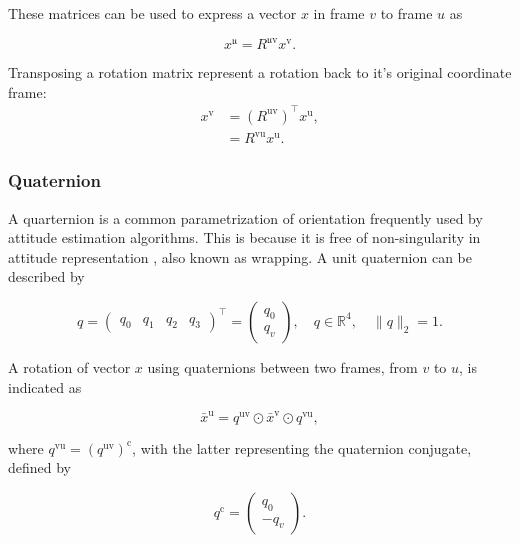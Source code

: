 These matrices can be used to express a vector $x$ in frame $v$ to frame $u$ as 

\begin{equation}
	\label{eq:rot_mat_rot_x}
	x^{\mathfrak{u}}=R^{\mathfrak{u} \mathrm{v}} x^{\mathrm{v}}.
\end{equation}

Transposing a rotation matrix represent a rotation back to it's original coordinate frame:
\begin{subequations}
	\begin{align}
		\label{eq:rot_mat_trans}
		x^{\mathrm{v}}&=\left(R^{\mathrm{uv}}\right)^{\top} x^{\mathrm{u}},\\
		&=R^{\mathrm{vu}} x^{\mathrm{u}}.
	\end{align}
\end{subequations}

\subsubsection{Quaternion}
A quarternion is a common parametrization of orientation frequently used by attitude estimation algorithms. This is because it is free of non-singularity in attitude representation \cite{Hashim2019}, also known as wrapping. A unit quaternion can be described by

\begin{equation}
	\label{eq:unit_quarternion}
	q=\left(\begin{array}{llll}{q_{0}} & {q_{1}} & {q_{2}} & {q_{3}}\end{array}\right)^{\top}
	=\left(\begin{array}{l}{q_{0}} \\ {q_{v}}\end{array}\right), 
	\quad q \in \mathbb{R}^{4}, 
	\quad\|q\|_{2}=1.
\end{equation}

A rotation of vector $x$ using quaternions between two frames, from $v$ to $u$, is indicated as

\begin{equation}
	\label{eq:quat_rot}
	\bar{x}^{\mathrm{u}}=q^{\mathrm{uv}} \odot \bar{x}^{\mathrm{v}} \odot q^{\mathrm{vu}},
\end{equation}

where $q^{\mathrm{vu}} = \left(q^{\mathrm{uv}}\right)^{\mathrm{c}}$, with the latter representing the quaternion conjugate, defined by 

\begin{equation}
	\label{eq:quat_conjugate}
	q^{\mathrm{c}}=\left(\begin{array}{c}{q_{0}} \\ {-q_{v}}\end{array}\right).
\end{equation}

